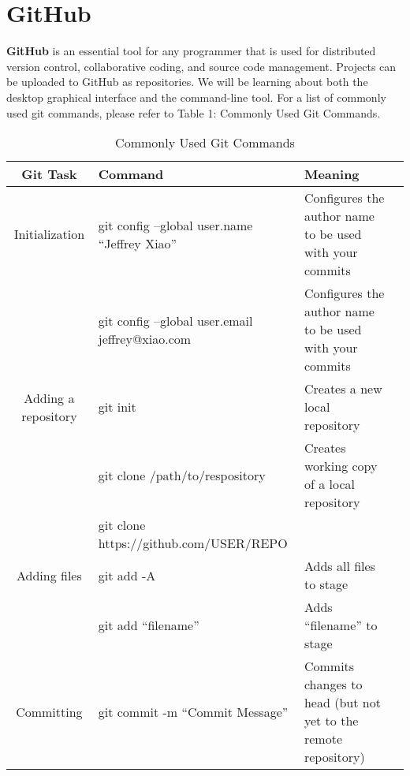 \documentclass[11pt, letterpaper]{article}
\begin{document}
	\section{GitHub}
		\textbf{GitHub} is an essential tool for any programmer that is used for distributed version control, collaborative coding, and source code management. Projects can be uploaded to GitHub as repositories. We will be learning about both the desktop graphical interface and the command-line tool. For a list of commonly used git commands, please refer to Table 1: Commonly Used Git Commands.
		
		\begin{table}
			\begin{center}
				\caption{Commonly Used Git Commands}
				\hspace*{-2.5cm}
				\vspace*{-5cm}
				\begin{tabular}{c|l|p{5cm} l}
					\toprule
					Git Task & Command & Meaning \\
					\midrule
					Initialization 
					
					& git config --global user.name ``Jeffrey Xiao'' & Configures the author name to be used with your commits \\\cmidrule{2-3}
									
					& git config --global user.email jeffrey@xiao.com & Configures the author name to be used with your commits \\
					
					\midrule
					Adding a repository
					
					& git init & Creates a new local repository \\\cmidrule{2-3}

					& git clone /path/to/respository & Creates working copy of a local repository \\\cmidrule{2-3}
										
					& git clone https://github.com/USER/REPO \\

					\midrule
					Adding files

					& git add -A & Adds all files to stage \\\cmidrule{2-3}
					
					& git add ``filename'' & Adds ``filename'' to stage \\

					\midrule
					Committing

					& git commit -m ``Commit Message'' & Commits changes to head (but not yet to the remote repository) \\\cmidrule{2-3}


\end{tabular}
\end{center}
\end{table}
\end{document}
